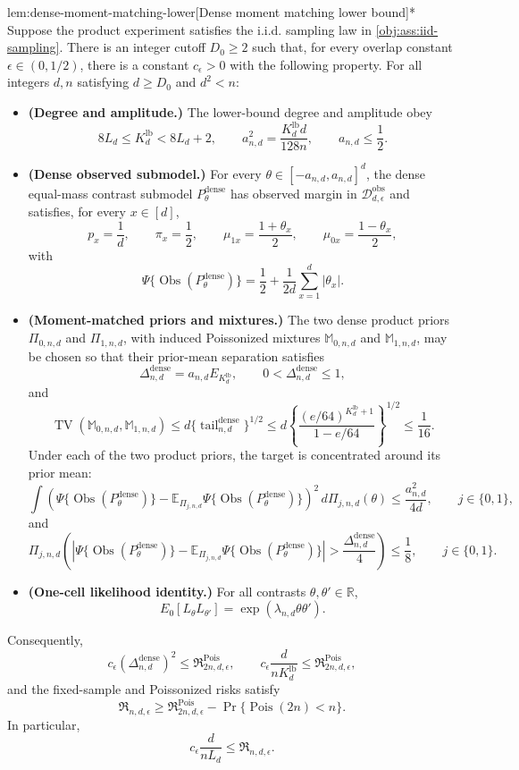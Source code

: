 \documentclass[11pt]{article}
\begin{document}
\begin{lemmav}{lem:dense-moment-matching-lower}[Dense moment matching lower bound]*
Suppose the product experiment satisfies the i.i.d. sampling law in \cref{obj:ass:iid-sampling}.  There is an integer cutoff \(D_0\geq2\) such that, for every overlap constant \(\epsilon\in(0,1/2)\), there is a constant \(c_\epsilon>0\) with the following property.  For all integers \(d,n\) satisfying \(d\geq D_0\) and \(d^2<n\):
\begin{itemize}
\item \textbf{(Degree and amplitude.)} The lower-bound degree and amplitude obey
\[
8L_d\leq K_d^{\mathrm{lb}}<8L_d+2,
\qquad
a_{n,d}^2=\frac{K_d^{\mathrm{lb}}d}{128n},
\qquad
a_{n,d}\leq \frac12 .
\]
\item \textbf{(Dense observed submodel.)} For every \(\theta\in[-a_{n,d},a_{n,d}]^d\), the dense equal-mass contrast submodel \(P_\theta^{\mathrm{dense}}\) has observed margin in \(\mathcal D_{d,\epsilon}^{\mathrm{obs}}\) and satisfies, for every \(x\in[d]\),
\[
p_x=\frac1d,
\qquad
\pi_x=\frac12,
\qquad
\mu_{1x}=\frac{1+\theta_x}{2},
\qquad
\mu_{0x}=\frac{1-\theta_x}{2},
\]
with
\[
\Psi\{\operatorname{Obs}(P_\theta^{\mathrm{dense}})\}
=
\frac12+\frac{1}{2d}\sum_{x=1}^d|\theta_x|.
\]
\item \textbf{(Moment-matched priors and mixtures.)} The two dense product priors \(\Pi_{0,n,d}\) and \(\Pi_{1,n,d}\), with induced Poissonized mixtures \(\mathbb M_{0,n,d}\) and \(\mathbb M_{1,n,d}\), may be chosen so that their prior-mean separation satisfies
\[
\Delta_{n,d}^{\mathrm{dense}}
=
a_{n,d}E_{K_d^{\mathrm{lb}}},
\qquad
0<\Delta_{n,d}^{\mathrm{dense}}\leq1,
\]
and
\[
\operatorname{TV}(\mathbb M_{0,n,d},\mathbb M_{1,n,d})
\leq
d\{\operatorname{tail}_{n,d}^{\mathrm{dense}}\}^{1/2}
\leq
d\left\{\frac{(e/64)^{K_d^{\mathrm{lb}}+1}}{1-e/64}\right\}^{1/2}
\leq\frac1{16}.
\]
Under each of the two product priors, the target is concentrated around its prior mean:
\[
\int
\left(\Psi\{\operatorname{Obs}(P_\theta^{\mathrm{dense}})\}
-\mathbb E_{\Pi_{j,n,d}}\Psi\{\operatorname{Obs}(P_\theta^{\mathrm{dense}})\}\right)^2
\,d\Pi_{j,n,d}(\theta)
\leq
\frac{a_{n,d}^2}{4d},
\qquad j\in\{0,1\},
\]
and
\[
\Pi_{j,n,d}\left(
\left|\Psi\{\operatorname{Obs}(P_\theta^{\mathrm{dense}})\}
-\mathbb E_{\Pi_{j,n,d}}\Psi\{\operatorname{Obs}(P_\theta^{\mathrm{dense}})\}\right|
>
\frac{\Delta_{n,d}^{\mathrm{dense}}}{4}
\right)
\leq
\frac18,
\qquad j\in\{0,1\}.
\]
\item \textbf{(One-cell likelihood identity.)} For all contrasts \(\theta,\theta'\in\mathbb R\),
\[
E_0[L_\theta L_{\theta'}]
=
\exp(\lambda_{n,d}\theta\theta').
\]
\end{itemize}
Consequently,
\[
c_\epsilon(\Delta_{n,d}^{\mathrm{dense}})^2
\leq
\mathfrak R^{\mathrm{Pois}}_{2n,d,\epsilon},
\qquad
c_\epsilon\frac{d}{nK_d^{\mathrm{lb}}}
\leq
\mathfrak R^{\mathrm{Pois}}_{2n,d,\epsilon},
\]
and the fixed-sample and Poissonized risks satisfy
\[
\mathfrak R_{n,d,\epsilon}
\geq
\mathfrak R^{\mathrm{Pois}}_{2n,d,\epsilon}
-
\Pr\{\operatorname{Pois}(2n)<n\}.
\]
In particular,
\[
c_\epsilon\frac{d}{nL_d}
\leq
\mathfrak R_{n,d,\epsilon}.
\]
\end{lemmav}
\end{document}
